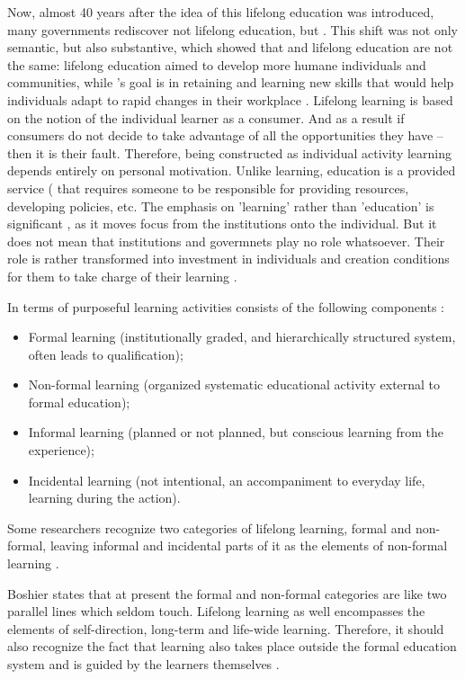 Now, almost 40 years after the idea of this lifelong education was introduced,
many governments rediscover not lifelong education, but \LLLs
\citep{Boshier2000}. This shift was not only semantic, but also substantive,
which showed that \LLLs and lifelong education are not the same: lifelong
education aimed to develop more humane individuals and communities, while
\LLLsn's goal is in retaining and learning new skills that would help
individuals adapt to rapid changes in their workplace
\citep{Medel-Anonuevo2001}. Lifelong learning is based on the notion of the
individual learner as a consumer. And as a result if consumers do not decide to
take advantage of all the opportunities they have – then it is their fault.
Therefore, being constructed as individual activity learning depends entirely on
personal motivation. Unlike learning, education is a provided service
(\citep{Boshier2000} that requires someone to be responsible for providing
resources, developing policies, etc. The emphasis on 'learning' rather than
'education' is significant \citep{Tuijnman2002}, as it moves focus from the
institutions onto the individual. But it does not mean that institutions and
govermnets play no role whatsoever. Their role is rather transformed into
investment in individuals and creation conditions for them to take charge of
their learning \citep{Chen2009}.

In terms of purposeful learning activities \LLLs consists of the following
components \citep{Longworth2003, Tuijnman2002}:

\begin{itemize}
  \item Formal learning (institutionally graded, and hierarchically structured
system, often leads to qualification);
  \item Non-formal learning (organized systematic educational activity external
to formal education);
  \item Informal learning (planned or not planned, but conscious learning from
the experience);
  \item Incidental learning (not intentional, an accompaniment to everyday life,
learning during the action).
\end{itemize} 

Some researchers recognize two categories of lifelong learning, formal and
non-formal, leaving informal and incidental parts of it as the elements of
non-formal learning \citep{Longworth2003}.

Boshier \citeyearpar{Boshier2000} states that at present the formal and non-formal
categories are like two parallel lines which seldom touch. Lifelong learning as well
encompasses the elements of self-direction, long-term and life-wide learning.
Therefore, it should also recognize the fact that learning also takes place
outside the formal education system and is guided by the learners themselves
\citep{Schuetze2006}. 

